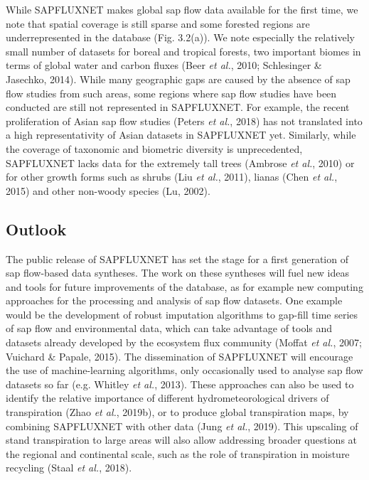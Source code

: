 \documentclass[11pt,twoside]{reedthesis}
\begin{document}
While SAPFLUXNET makes global sap flow data available for the first
time, we note that spatial coverage is still sparse and some forested
regions are underrepresented in the database (Fig. 3.2(a)). We note
especially the relatively small number of datasets for boreal and
tropical forests, two important biomes in terms of global water and
carbon fluxes (Beer \emph{et al.}, 2010; Schlesinger \& Jasechko, 2014).
While many geographic gaps are caused by the absence of sap flow studies
from such areas, some regions where sap flow studies have been conducted
are still not represented in SAPFLUXNET. For example, the recent
proliferation of Asian sap flow studies (Peters \emph{et al.}, 2018) has
not translated into a high representativity of Asian datasets in
SAPFLUXNET yet. Similarly, while the coverage of taxonomic and biometric
diversity is unprecedented, SAPFLUXNET lacks data for the extremely tall
trees (Ambrose \emph{et al.}, 2010) or for other growth forms such as
shrubs (Liu \emph{et al.}, 2011), lianas (Chen \emph{et al.}, 2015) and
other non-woody species (Lu, 2002).\par

\subsection{Outlook}\label{outlook}

The public release of SAPFLUXNET has set the stage for a first
generation of sap flow-based data syntheses. The work on these syntheses
will fuel new ideas and tools for future improvements of the database,
as for example new computing approaches for the processing and analysis
of sap flow datasets. One example would be the development of robust
imputation algorithms to gap-fill time series of sap flow and
environmental data, which can take advantage of tools and datasets
already developed by the ecosystem flux community (Moffat \emph{et al.},
2007; Vuichard \& Papale, 2015). The dissemination of SAPFLUXNET will
encourage the use of machine-learning algorithms, only occasionally used
to analyse sap flow datasets so far (e.g. Whitley \emph{et al.}, 2013).
These approaches can also be used to identify the relative importance of
different hydrometeorological drivers of transpiration (Zhao \emph{et
al.}, 2019b), or to produce global transpiration maps, by combining
SAPFLUXNET with other data (Jung \emph{et al.}, 2019). This upscaling of
stand transpiration to large areas will also allow addressing broader
questions at the regional and continental scale, such as the role of
transpiration in moisture recycling (Staal \emph{et al.}, 2018).\par
\end{document}
